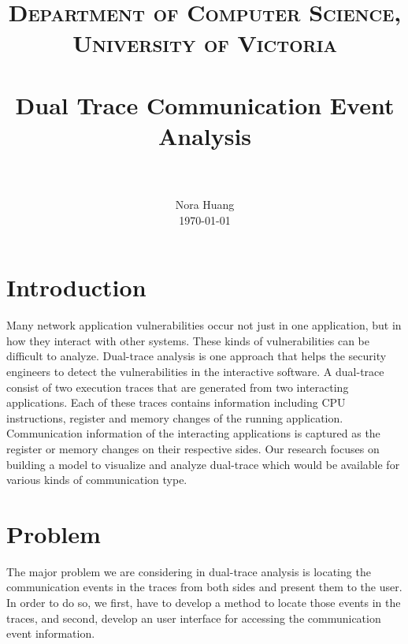 \documentclass[paper=a4, fontsize=11pt]{scrartcl}
\title{
		\usefont{OT1}{bch}{b}{n}
		\normalfont \normalsize \textsc{Department of Computer Science,  University of Victoria} \\ [25pt]
		\horrule{0.5pt} \\[0.4cm]
		\huge Dual Trace Communication Event Analysis  \\
		\horrule{2pt} \\[0.5cm]
}
\author{
		\normalfont 								\normalsize
        Nora Huang\\[-3pt]		\normalsize
        \today
}
\date{}
\numberwithin{equation}{section}		%
\numberwithin{figure}{section}			%
\numberwithin{table}{section}				%
\begin{document}
\maketitle

\section{Introduction}
Many network application vulnerabilities occur not just in one application, but in how they interact with other systems. These kinds of vulnerabilities can be difficult to analyze. Dual-trace analysis is one approach that helps the security engineers to detect the vulnerabilities in the interactive software. A dual-trace consist of two execution traces that are generated from two interacting applications. Each of these traces contains information including CPU instructions, register and memory changes of the running application. Communication information of the interacting applications is captured as the register or memory changes on their respective sides. Our research focuses on building a model to visualize and analyze dual-trace which would be available for various kinds of communication type.

\section{Problem}
The major problem we are considering in dual-trace analysis is locating the communication events in the traces from both sides and present them to the user. In order to do so,  we first, have to develop a method to locate those events in the traces, and second, develop an user interface for accessing the communication event information.\par
\end{document}
